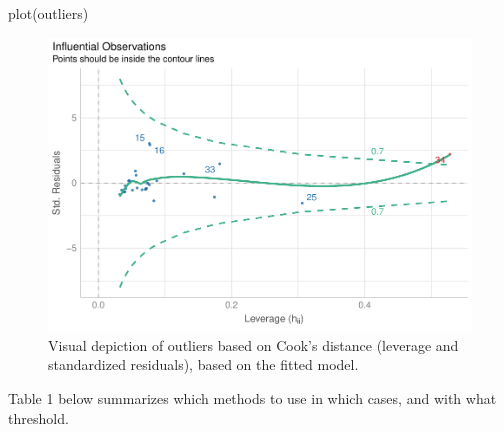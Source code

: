 \documentclass{article}
\newenvironment{Shaded}{\begin{snugshade}}{\end{snugshade}}
\newcommand{\FunctionTok}[1]{\textcolor[rgb]{0.00,0.00,0.00}{#1}}
\newcommand{\NormalTok}[1]{#1}
\begin{document}
\begin{Shaded}
\begin{Highlighting}[]
\FunctionTok{plot}\NormalTok{(outliers)}
\end{Highlighting}
\end{Shaded}

\begin{figure}
\includegraphics[width=1\linewidth]{paper_files/figure-latex/model-1} \caption{Visual depiction of outliers based on Cook's distance (leverage and standardized residuals), based on the fitted model.}\label{fig:model}
\end{figure}

Table 1 below summarizes which methods to use in which cases, and with
what threshold.
\end{document}
